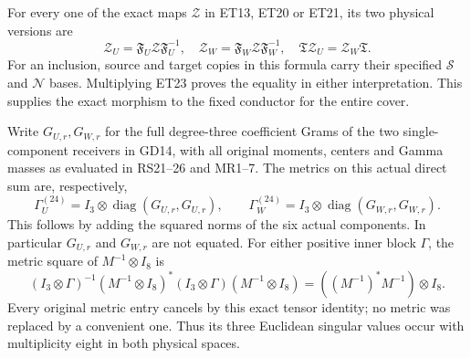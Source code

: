 \documentclass[11pt]{article}
\newcommand{\diag}{\operatorname{diag}}
\begin{document}
For every one of the exact maps $\mathcal Z$ in ET13, ET20 or ET21,
its two physical versions are
\[
 \mathcal Z_U=\mathfrak F_U\mathcal Z\mathfrak F_U^{-1},\quad
 \mathcal Z_W=\mathfrak F_W\mathcal Z\mathfrak F_W^{-1},\quad
 \mathfrak T\mathcal Z_U=\mathcal Z_W\mathfrak T .
 \tag{ET24}
\]
For an inclusion, source and target copies in this formula carry their
specified $\mathscr S$ and $\mathscr N$ bases. Multiplying ET23 proves
the equality in either interpretation. This supplies the exact
morphism to the fixed conductor for the entire cover.

Write $G_{U,r},G_{W,r}$ for the full degree-three coefficient Grams
of the two single-component receivers in GD14, with all original
moments, centers and Gamma masses as evaluated in RS21--26 and MR1--7.
The metrics on this actual direct sum are, respectively,
\[
 \Gamma_U^{(24)}=I_3\otimes\diag(G_{U,r},G_{U,r}),\qquad
 \Gamma_W^{(24)}=I_3\otimes\diag(G_{W,r},G_{W,r}).
 \tag{ET25}
\]
This follows by adding the squared norms of the six actual components.
In particular $G_{U,r}$ and $G_{W,r}$ are not equated.
For either positive inner block $\Gamma$, the metric square of
$M^{-1}\otimes I_8$ is
\[
 (I_3\otimes\Gamma)^{-1}
 (M^{-1}\otimes I_8)^*(I_3\otimes\Gamma)
 (M^{-1}\otimes I_8)
 =((M^{-1})^*M^{-1})\otimes I_8 .
 \tag{ET26}
\]
Every original metric entry cancels by this exact tensor identity;
no metric was replaced by a convenient one. Thus its three Euclidean
singular values occur with multiplicity eight in both physical spaces.
\end{document}
